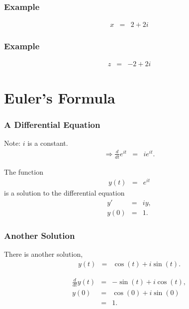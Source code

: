 \begin{frame}
  \frametitle{Example}

  \begin{eqnarray*}
    x & = &  2 + 2i
  \end{eqnarray*}

\end{frame}


\begin{frame}
  \frametitle{Example}

  \begin{eqnarray*}
    z & = & -2 + 2i
  \end{eqnarray*}
    
\end{frame}

\section{Euler's Formula}

\begin{frame}
  \frametitle{A Differential Equation}

  Note: $i$ is a constant.
  \begin{eqnarray*}
    \Rightarrow \frac{d}{dt} e^{it} & = & i e^{it}.
  \end{eqnarray*}

  The function
  \begin{eqnarray*}
    y(t) & = & e^{it}
  \end{eqnarray*}
  is a solution to the differential equation
  \begin{eqnarray*}
    y' & = & iy, \\
    y(0) & = & 1.
  \end{eqnarray*}

\end{frame}

\begin{frame}
  \frametitle{Another Solution}

  There is another solution,
  \begin{eqnarray*}
    y(t) & = & \cos(t) + i \sin(t).
  \end{eqnarray*}

  \begin{eqnarray*}
    \frac{d}{dt} y(t) & = & -\sin(t) + i \cos(t), \\
    y(0) & = & \cos(0) + i\sin(0) \\
    & = & 1.
  \end{eqnarray*}

\end{frame}


